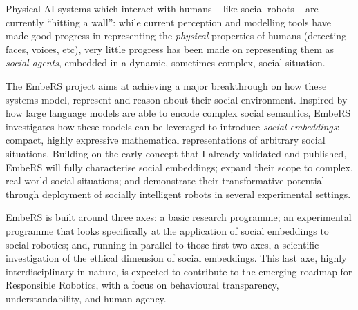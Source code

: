 \documentclass[11pt,a4paper]{report}
\newcommand{\project}{EmbeRS\xspace}
\begin{document}
Physical AI systems which interact with humans -- like social robots -- are
currently ``hitting a wall'': while current perception and modelling tools have
made good progress in representing the \emph{physical} properties of humans (detecting
faces, voices, etc), very little progress has been made on representing them as
\emph{social agents}, embedded in a dynamic, sometimes complex, social situation.

The \project project aims at achieving a major breakthrough on how these systems
model, represent and reason about their social environment. Inspired by how
large language models are able to encode complex social semantics, \project
investigates how these models can be leveraged to introduce \emph{social
embeddings}: compact, highly expressive mathematical representations of
arbitrary social situations.  Building on the early concept that I already
validated and published, \project will fully characterise social embeddings;
expand their scope to complex, real-world social situations; and demonstrate
their transformative potential through deployment of socially
intelligent robots in several experimental settings.

\project is built around three axes: a basic research programme; an experimental
programme that looks specifically at the application of social embeddings to
social robotics; and, running in parallel to those first two axes, a scientific
investigation of the ethical dimension of social embeddings. This last axe,
highly interdisciplinary in nature, is expected to contribute to the emerging
roadmap for Responsible Robotics, with a focus on behavioural transparency,
understandability, and human agency.
%
%
%
\end{document}
